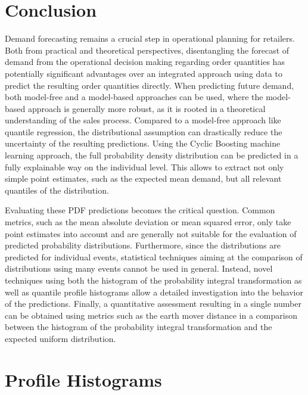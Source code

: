 \documentclass[BCOR=1mm, DIV=calc,10pt,
twoside=true,
twocolumn,
headings=normal]{scrartcl}
\begin{document}
\section{Conclusion}
Demand forecasting remains a crucial step in operational planning for retailers. Both from practical and theoretical perspectives, disentangling the forecast of demand from the operational decision making regarding order quantities has potentially significant advantages over an integrated approach using data to predict the resulting order quantities directly. When predicting future demand, both model-free and a model-based approaches can be used, where the model-based approach is generally more robust, as it is rooted in a theoretical understanding of the sales process. Compared to a model-free approach like quantile regression, the distributional assumption can drastically reduce the uncertainty of the resulting predictions. Using the Cyclic Boosting machine learning approach, the full probability density distribution can be predicted in a fully explainable way on the individual level. This allows to extract not only simple point estimates, such as the expected mean demand, but all relevant quantiles of the distribution.

Evaluating these PDF predictions becomes the critical question. Common metrics, such as the mean absolute deviation or mean squared error, only take point estimates into account and are generally not suitable for the evaluation of predicted probability distributions. Furthermore, since the distributions are predicted for individual events, statistical techniques aiming at the comparison of distributions using many events cannot be used in general. Instead, novel techniques using both the histogram of the probability integral transformation as well as quantile profile histograms allow a detailed investigation into the behavior of the predictions. Finally, a quantitative assessment resulting in a single number can be obtained using metrics such as the earth mover distance in a comparison between the histogram of the probability integral transformation and the expected uniform distribution.





\appendix

\section{Profile Histograms}
\label{sec:profile}
\end{document}
